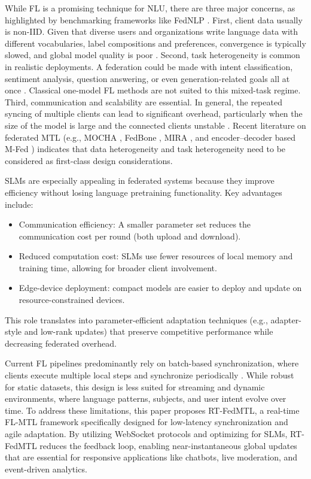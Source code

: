While FL is a promising technique for NLU, there are three major concerns, as highlighted by benchmarking frameworks like FedNLP \cite{lin2021fednlp}. First, client data usually is non-IID. Given that diverse users and organizations write language data with different vocabularies, label compositions and preferences, convergence is typically slowed, and global model quality is poor \cite{li2020fedprox,smith2017mocha}. Second, task heterogeneity is common in realistic deployments. A federation could be made with intent classification, sentiment analysis, question answering, or even generation-related goals all at once \cite{smith2017mocha,chen2024fedbone,zhou2025mfed}. Classical one-model FL methods are not suited to this mixed-task regime. Third, communication and scalability are essential. In general, the repeated syncing of multiple clients can lead to significant overhead, particularly when the size of the model is large and the connected clients unstable \cite{mcmahan2017fedavg,chen2024fedbone}. Recent literature on federated MTL (e.g., MOCHA \cite{smith2017mocha}, FedBone \cite{chen2024fedbone}, MIRA \cite{elbakary2025mira}, and encoder--decoder based M-Fed \cite{zhou2025mfed}) indicates that data heterogeneity and task heterogeneity need to be considered as first-class design considerations.

SLMs are especially appealing in federated systems because they improve efficiency without losing language pretraining functionality. Key advantages include:
\begin{itemize}
    \item Communication efficiency: A smaller parameter set reduces the communication cost per round (both upload and download).
    \item Reduced computation cost: SLMs use fewer resources of local memory and training time, allowing for broader client involvement.
    \item Edge-device deployment: compact models are easier to deploy and update on resource-constrained devices.
\end{itemize}
This role translates into parameter-efficient adaptation techniques (e.g., adapter-style and low-rank updates) that preserve competitive performance while decreasing federated overhead.

Current FL pipelines predominantly rely on batch-based synchronization, where clients execute multiple local steps and synchronize periodically \cite{mcmahan2017fedavg,li2020fedprox}. While robust for static datasets, this design is less suited for streaming and dynamic environments, where language patterns, subjects, and user intent evolve over time. To address these limitations, this paper proposes RT-FedMTL, a real-time FL-MTL framework specifically designed for low-latency synchronization and agile adaptation. By utilizing WebSocket protocols and optimizing for SLMs, RT-FedMTL reduces the feedback loop, enabling near-instantaneous global updates that are essential for responsive applications like chatbots, live moderation, and event-driven analytics.

